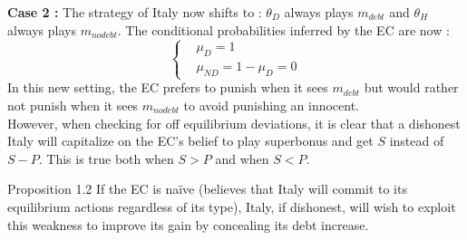 \documentclass{article}
\begin{document}
\textbf{Case 2 : }
The strategy of Italy now shifts to : $\theta_D$ always plays $m_{debt}$ and $\theta_H$ always plays $m_{nodebt}$.
The conditional probabilities inferred by the EC are now : 
\begin{equation}
\left\{
\begin{aligned}
    &\mu_D = 1 \\
    &\mu_{ND}=1-\mu_D=0
\end{aligned}
\right.
\end{equation}
In this new setting, the EC prefers to punish when it sees $m_{debt}$ but would rather not punish when it sees $m_{nodebt}$ to avoid punishing an innocent. \\
However, when checking for off equilibrium deviations, it is clear that a dishonest Italy will capitalize on the EC's belief to play superbonus and get $S$ instead of $S-P$. This is true both when $S>P$ and when $S<P$.
\begin{simplebox}{Proposition 1.2}
If the EC is naïve (believes that Italy will commit to its equilibrium actions regardless of its type), Italy, if dishonest, will wish to exploit this weakness to improve its gain by concealing its debt increase. 
\end{simplebox}
\end{document}
